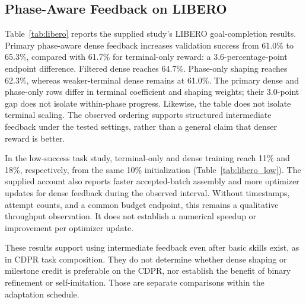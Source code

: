 \subsection{Phase-Aware Feedback on LIBERO}\label{sec:libero_results}
Table~\ref{tab:libero} reports the supplied study's LIBERO goal-completion results. Primary phase-aware dense feedback increases validation success from 61.0\% to 65.3\%, compared with 61.7\% for terminal-only reward: a 3.6-percentage-point endpoint difference. Filtered dense reaches 64.7\%. Phase-only shaping reaches 62.3\%, whereas weaker-terminal dense remains at 61.0\%. The primary dense and phase-only rows differ in terminal coefficient and shaping weights; their 3.0-point gap does not isolate within-phase progress. Likewise, the table does not isolate terminal scaling. The observed ordering supports structured intermediate feedback under the tested settings, rather than a general claim that denser reward is better.


In the low-success task study, terminal-only and dense training reach 11\% and 18\%, respectively, from the same 10\% initialization (Table~\ref{tab:libero_low}). The supplied account also reports faster accepted-batch assembly and more optimizer updates for dense feedback during the observed interval. Without timestamps, attempt counts, and a common budget endpoint, this remains a qualitative throughput observation. It does not establish a numerical speedup or improvement per optimizer update.


These results support using intermediate feedback even after basic skills exist, as in CDPR task composition. They do not determine whether dense shaping or milestone credit is preferable on the CDPR, nor establish the benefit of binary refinement or self-imitation. Those are separate comparisons within the adaptation schedule.
